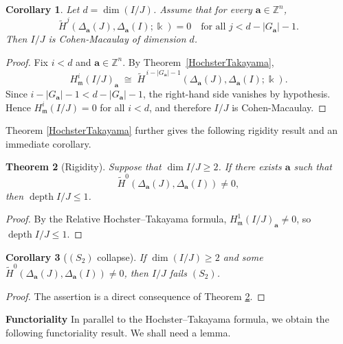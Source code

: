 \documentclass[12pt]{amsart}
\numberwithin{equation}{section}
\newtheorem{theorem}{Theorem}[section]
\newtheorem{corollary}[theorem]{Corollary}
\theoremstyle{definition}
\theoremstyle{definition}
\DeclareMathOperator{\depth}{depth}
\newcommand{\ZZ}{{\mathbb Z}}
\def\kk{{\Bbbk}}
\def\mm{{\mathfrak m}}
\begin{document}
\begin{corollary}\label{thm:relative-reisner-implication}
	Let $d=\dim(I/J)$. 
	Assume that for every $\mathbf a\in\ZZ^n$,
	\[
	\widetilde H^j\!\left(\Delta_{\mathbf a}(J),\Delta_{\mathbf a}(I);\kk\right)=0
	\quad\text{for all } j< d-|G_{\mathbf a}|-1.
	\]
	Then $I/J$ is Cohen-Macaulay of dimension $d$.
\end{corollary}

\begin{proof}
	Fix $i<d$ and $\mathbf a\in\ZZ^n$.
	By Theorem~\ref{HochsterTakayama},
	\[
	H^i_{\mm}(I/J)_{\mathbf a}
	\;\cong\;
	\widetilde H^{\,i-|G_{\mathbf a}|-1}
	\!\left(\Delta_{\mathbf a}(J),\Delta_{\mathbf a}(I);\kk\right).
	\]
	Since $i-|G_{\mathbf a}|-1<d-|G_{\mathbf a}|-1$, the right-hand side vanishes
	by hypothesis. Hence $H^i_{\mm}(I/J)=0$ for all $i<d$, and therefore $I/J$
	is Cohen-Macaulay.
\end{proof}

\medskip

Theorem \ref{HochsterTakayama} further gives the following rigidity result and an immediate corollary.

\begin{theorem}[Rigidity]\label{thm:rigidity}
	Suppose that $\dim I/J \ge 2$.
	If there exists $\mathbf a$ such that
	\[
	\widetilde H^0(\Delta_{\mathbf a}(J),\Delta_{\mathbf a}(I)) \neq 0,
	\]
	then $\depth I/J \le 1$.
\end{theorem}

\begin{proof}
	By the Relative Hochster--Takayama formula,
	$H^1_{\mm}(I/J)_{\mathbf a} \neq 0$, so $\depth I/J \le 1$.
\end{proof}

\begin{corollary}[$(S_2)$ collapse]\label{cor:S2}
	If $\dim(I/J)\ge 2$ and some
	$\widetilde H^0(\Delta_{\mathbf a}(J),\Delta_{\mathbf a}(I)) \neq 0$,
	then $I/J$ fails $(S_2)$.
\end{corollary}

\begin{proof}
	The assertion is a direct consequence of Theorem \ref{thm:rigidity}.
\end{proof}

\medskip

\noindent\textbf{Functoriality} In parallel to the Hochster--Takayama formula, we obtain the following functoriality result. We shall need a lemma.
\end{document}
